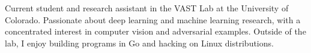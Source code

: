 

\begin{cvparagraph}

Current student and research assistant in the VAST Lab at the University of Colorado. Passionate about deep learning and machine learning research, with a concentrated interest in computer vision and adversarial examples. Outside of the lab, I enjoy building programs in Go and hacking on Linux distributions. 
\end{cvparagraph}
